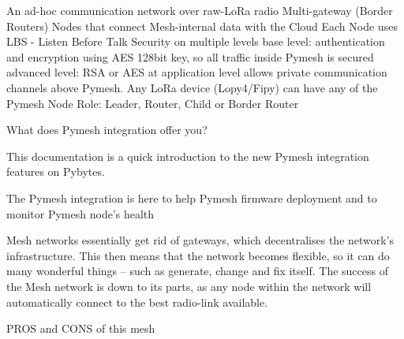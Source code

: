 				An ad-hoc communication network over raw-LoRa radio
				Multi-gateway (Border Routers) Nodes that connect Mesh-internal data with the Cloud
				Each Node uses LBS - Listen Before Talk
				Security on multiple levels
				base level: authentication and encryption using AES 128bit key, so all traffic inside Pymesh is secured
				advanced level: RSA or AES at application level allows private communication channels above Pymesh.
				Any LoRa device (Lopy4/Fipy) can have any of the Pymesh Node Role: Leader, Router, Child or Border Router
				
				What does Pymesh integration offer you?
				
				This documentation is a quick introduction to the new Pymesh integration features on Pybytes.
				
				The Pymesh integration is here to help Pymesh firmware deployment and to monitor Pymesh node’s health
	
	
				
				
				Mesh networks essentially get rid of gateways, which decentralises the network’s infrastructure. This then means that the network becomes flexible, so it can do many wonderful things – such as generate, change and fix itself. The success of the Mesh network is down to its parts, as any node within the network will automatically connect to the best radio-link available.
				
				
				PROS and CONS of this mesh
